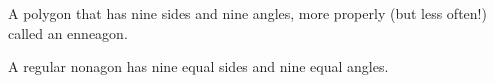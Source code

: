 A polygon that has nine sides and nine angles, more properly 
(but less often!) called an enneagon.

\par
A regular nonagon has nine equal sides and nine equal angles.